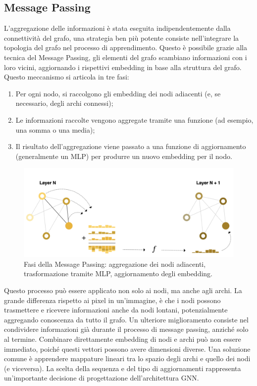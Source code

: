\subsection{Message Passing}

L’aggregazione delle informazioni è stata eseguita indipendentemente dalla connettività del grafo, una strategia ben più potente consiste nell’integrare la topologia del grafo nel processo di apprendimento. Questo è possibile grazie alla tecnica del Message Passing, gli elementi del grafo scambiano informazioni con i loro vicini, aggiornando i rispettivi embedding in base alla struttura del grafo. Questo meccanismo si articola in tre fasi:

\begin{enumerate}
    \item Per ogni nodo, si raccolgono gli embedding dei nodi adiacenti (e, se necessario, degli archi connessi);
    \item Le informazioni raccolte vengono aggregate tramite una funzione (ad esempio, una somma o una media);
    \item Il risultato dell’aggregazione viene passato a una funzione di aggiornamento (generalmente un MLP) per produrre un nuovo embedding per il nodo.
\end{enumerate}

\begin{figure}
    \centering
    \includegraphics[width=\textwidth]{figure/MessagePassing.png}
    \caption{Fasi della Message Passing: aggregazione dei nodi adiacenti, trasformazione tramite MLP, aggiornamento degli embedding.}
    \label{fig:messPass}
\end{figure}
Questo processo può essere applicato non solo ai nodi, ma anche agli archi. La grande differenza rispetto ai pixel in un’immagine, è che i nodi possono trasmettere e ricevere informazioni anche da nodi lontani, potenzialmente aggregando conoscenza da tutto il grafo. Un ulteriore miglioramento consiste nel condividere informazioni già durante il processo di message passing, anziché solo al termine. Combinare direttamente embedding di nodi e archi può non essere immediato, poiché questi vettori possono avere dimensioni diverse. Una soluzione comune è apprendere mappature lineari tra lo spazio degli archi e quello dei nodi (e viceversa). La scelta della sequenza e del tipo di aggiornamenti rappresenta un'importante decisione di progettazione dell'architettura GNN.

